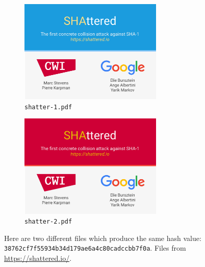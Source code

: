 \begin{figure}
\centering
\begin{subfigure}{\textwidth}
    \centering
    \includegraphics[width=0.75\textwidth]{figures/hash_functions/shattered-1.pdf}
    \caption{\texttt{shatter-1.pdf}}
    \label{fig:shattered-1}
    \end{subfigure}
    \vspace{0.5cm}

    \begin{subfigure}{\textwidth}
    \centering
    \includegraphics[width=0.75\textwidth]{figures/hash_functions/shattered-2.pdf}
    \caption{\texttt{shatter-2.pdf}}
    \label{fig:shattered-2}
    \end{subfigure}

\caption[Example Files Producing \ShaOne{} Collision]{Here
    are two different files which produce the same \ShaOne{} hash value:
    \texttt{38762cf7f55934b34d179ae6a4c80cadccbb7f0a}.
    Files from \url{https://shattered.io/}.}
\label{fig:shattered}
\end{figure}

